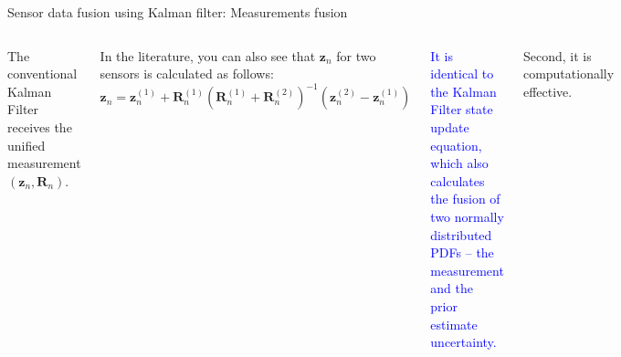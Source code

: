 \begin{frame}{Sensor data fusion using Kalman filter: Measurements fusion}
\begin{columns}
        The conventional Kalman Filter receives the unified measurement \( (\bm{z}_n, \bm{R}_n) \).
        
        In the literature, you can also see that \( \bm{z}_n \) for two sensors is calculated as follows:
        \begin{equation*}
        \bm{z}_n = \bm{z}^{(1)}_n + \bm{R}^{(1)}_n \left( \bm{R}^{(1)}_n + \bm{R}^{(2)}_n \right)^{-1} \left( \bm{z}^{(2)}_n - \bm{z}^{(1)}_n \right)
        \end{equation*}
        
        \textcolor{blue}{It is identical to the Kalman Filter state update equation, which also calculates the fusion of two normally distributed PDFs – the measurement and the prior estimate uncertainty.}
        
        Second, it is computationally effective.
\end{columns}
\end{frame}


